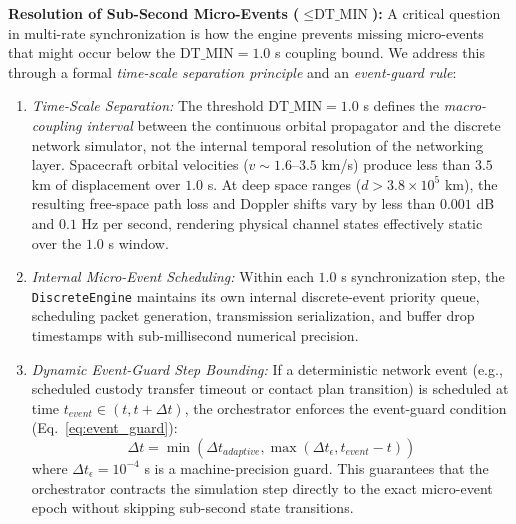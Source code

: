 \documentclass[a4paper,fleqn]{cas-sc}
\begin{document}
\noindent\textbf{Resolution of Sub-Second Micro-Events ($\le \text{DT\_MIN}$):} A critical question in multi-rate synchronization is how the engine prevents missing micro-events that might occur below the $\text{DT\_MIN} = 1.0$ s coupling bound. We address this through a formal \textit{time-scale separation principle} and an \textit{event-guard rule}:
\begin{enumerate}
    \item \textit{Time-Scale Separation:} The threshold $\text{DT\_MIN} = 1.0$ s defines the \textit{macro-coupling interval} between the continuous orbital propagator and the discrete network simulator, not the internal temporal resolution of the networking layer. Spacecraft orbital velocities ($v \sim 1.6$--$3.5$ km/s) produce less than $3.5$ km of displacement over $1.0$ s. At deep space ranges ($d > 3.8 \times 10^5$ km), the resulting free-space path loss and Doppler shifts vary by less than $0.001$ dB and $0.1$ Hz per second, rendering physical channel states effectively static over the $1.0$ s window.
    \item \textit{Internal Micro-Event Scheduling:} Within each $1.0$ s synchronization step, the \texttt{DiscreteEngine} maintains its own internal discrete-event priority queue, scheduling packet generation, transmission serialization, and buffer drop timestamps with sub-millisecond numerical precision.
    \item \textit{Dynamic Event-Guard Step Bounding:} If a deterministic network event (e.g., scheduled custody transfer timeout or contact plan transition) is scheduled at time $t_{event} \in (t, t + \Delta t)$, the orchestrator enforces the event-guard condition (Eq.~\eqref{eq:event_guard}):
    \begin{equation}
        \Delta t = \min\left(\Delta t_{adaptive}, \max\left(\Delta t_{\epsilon}, t_{event} - t\right)\right)
    \end{equation}
    where $\Delta t_{\epsilon} = 10^{-4}$ s is a machine-precision guard. This guarantees that the orchestrator contracts the simulation step directly to the exact micro-event epoch without skipping sub-second state transitions.
\end{enumerate}
\end{document}
